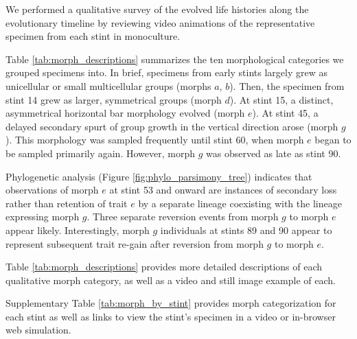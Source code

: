 

We performed a qualitative survey of the evolved life histories along the evolutionary timeline by reviewing video animations of the representative specimen from each stint in monoculture.

Table \ref{tab:morph_descriptions} summarizes the ten morphological categories we grouped specimens into.
In brief, specimens from early stints largely grew as unicellular or small multicellular groups (morphs $a$, $b$).
Then, the specimen from stint 14 grew as larger, symmetrical groups (morph $d$).
At stint 15, a distinct, asymmetrical horizontal bar morphology evolved (morph $e$).
At stint 45, a delayed secondary spurt of group growth in the vertical direction arose (morph $g$).
This morphology was sampled frequently until stint 60, when morph $e$ began to be sampled primarily again.
However, morph $g$ was observed as late as stint 90.

Phylogenetic analysis (Figure \ref{fig:phylo_parsimony_tree}) indicates that observations of morph $e$ at stint 53 and onward are instances of secondary loss rather than retention of trait $e$ by a separate lineage coexisting with the lineage expressing morph $g$.
Three separate reversion events from morph $g$ to morph $e$ appear likely.
Interestingly, morph $g$ individuals at stints 89 and 90 appear to represent subsequent trait re-gain after reversion from morph $g$ to morph $e$.

Table \ref{tab:morph_descriptions} provides more detailed descriptions of each qualitative morph category, as well as a video and still image example of each.

Supplementary Table \ref{tab:morph_by_stint} provides morph categorization for each stint as well as links to view the stint's specimen in a video or in-browser web simulation.



